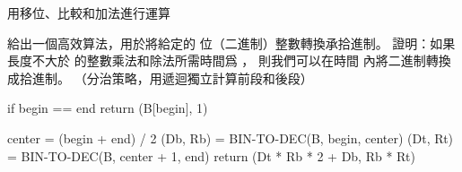 \startANSWER
用移位、比較和加法進行運算
\stopANSWER

\startEXERCISE
給出一個高效算法，用於將給定的 \m{\beta} 位（二進制）整數轉換承拾進制。
證明：如果長度不大於 \m{\beta} 的整數乘法和除法所需時間爲 ，
則我們可以在時間  內將二進制轉換成拾進制。
（\hint 分治策略，用遞迴獨立計算前段和後段）
\stopEXERCISE

\startANSWER
{}
\startCLRS
if begin == end
	return (B[begin], 1)

center = (begin + end) / 2
(Db, Rb) = BIN-TO-DEC(B, begin, center)
(Dt, Rt) = BIN-TO-DEC(B, center + 1, end)
return (Dt * Rb * 2 + Db, Rb * Rt)
\stopCLRS
\stopANSWER

\stopsection
